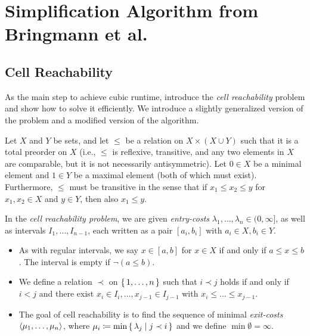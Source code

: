 \section{Simplification Algorithm from Bringmann et al.}
\label{sec:cubic_algo}


\subsection{Cell Reachability}
\label{ssec:cell_reachability}
As the main step to achieve cubic runtime, \citeauthor{polyline_simplification_has_cubic_complexity_bringmannetal} introduce the \emph{cell reachability} problem and show how to solve it efficiently. We introduce a slightly generalized version of the problem and a modified version of the algorithm. 

\begin{definition}
	Let \(X\) and \(Y\) be sets, and let \(\leq\) be a relation on \(X \times (X \cup Y)\) such that it is a total preorder on \(X\) (i.e., \(\leq\) is reflexive, transitive, and any two elements in \(X\) are comparable, but it is not necessarily antisymmetric). Let \(0 \in X\) be a minimal element and \(1 \in Y\) be a maximal element (both of which must exist). Furthermore, \(\leq\) must be transitive in the sense that if \(x_1 \leq x_2 \leq y\) for \(x_1, x_2 \in X\) and \(y \in Y\), then also \(x_1 \leq y\).

	In the \emph{cell reachability problem}, we are given \emph{entry-costs} \(\lambda_1, \dots, \lambda_n \in (0, \infty]\), as well as intervals \(I_1, \dots, I_{n-1}\), each written as a pair \([a_i, b_i]\) with \(a_i \in X, b_i \in Y\).

	\begin{itemize}
		\item As with regular intervals, we say \(x \in [a, b]\) for \(x \in X\) if and only if \(a \leq x \leq b\). The interval is empty if \(\lnot (a \leq b)\).

		\item We define a relation \(\prec\) on \(\set{1, \dots, n}\) such that \(i \prec j\) holds if and only if \(i < j\) and there exist \(x_i \in I_i, \dots, x_{j-1} \in I_{j-1}\) with \(x_i \leq \dots \leq x_{j - 1}\).

		\item The goal of cell reachability is to find the sequence of minimal \emph{exit-costs} \(\left\langle\mu_1, \dots, \mu_n\right\rangle\), where \(\mu_i \coloneq \min \set{ \lambda_j \mid j \prec i}\) and we define \(\min \emptyset = \infty\).
	\end{itemize}
\end{definition}

